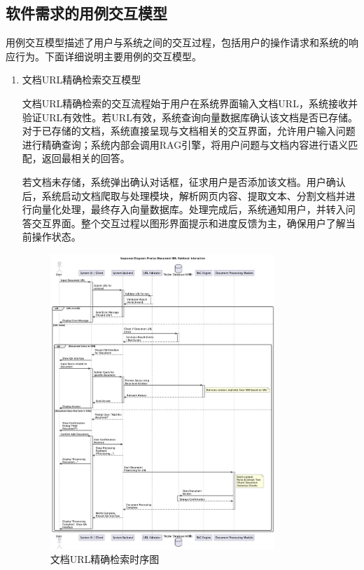 \documentclass[
    report,     %
    oneside,    %
    UTF8,       %
    zihao=-4    %
]{config} %
\begin{document}
\subsection{软件需求的用例交互模型}

用例交互模型描述了用户与系统之间的交互过程，包括用户的操作请求和系统的响应行为。下面详细说明主要用例的交互模型。

\begin{enumerate}[label=(\arabic*)]
    \item 文档URL精确检索交互模型
    
    文档URL精确检索的交互流程始于用户在系统界面输入文档URL，系统接收并验证URL有效性。若URL有效，系统查询向量数据库确认该文档是否已存储。对于已存储的文档，系统直接呈现与文档相关的交互界面，允许用户输入问题进行精确查询；系统内部会调用RAG引擎，将用户问题与文档内容进行语义匹配，返回最相关的回答。
    
    若文档未存储，系统弹出确认对话框，征求用户是否添加该文档。用户确认后，系统启动文档爬取与处理模块，解析网页内容、提取文本、分割文档并进行向量化处理，最终存入向量数据库。处理完成后，系统通知用户，并转入问答交互界面。整个交互过程以图形界面提示和进度反馈为主，确保用户了解当前操作状态。
    \begin{figure}[H]
        \centering
        \includegraphics[width=0.8\textwidth]{UML/Squence/DocumentRetrievalSequenceDiagram.png}
        \caption{文档URL精确检索时序图}
        \label{fig:DocumentRetrievalSequenceDiagram}
    \end{figure}
    

\end{enumerate}
\end{document}

